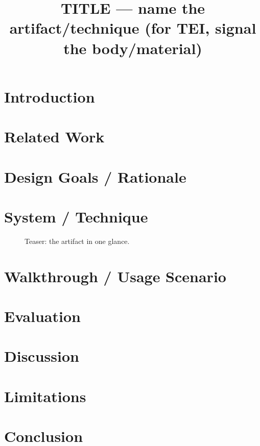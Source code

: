 \documentclass[sigconf,review,anonymous]{acmart}
\begin{document}
\title{TITLE — name the artifact/technique (for TEI, signal the body/material)}
\begin{abstract}
\end{abstract}
\maketitle

\section{Introduction}            %
\section{Related Work}            %
\section{Design Goals / Rationale}
\section{System / Technique}       %
\begin{figure}[t]\centering\caption{Teaser: the artifact in one glance.}\end{figure}
\section{Walkthrough / Usage Scenario}
\section{Evaluation}               %
\section{Discussion}
\section{Limitations}
\section{Conclusion}

\end{document}
